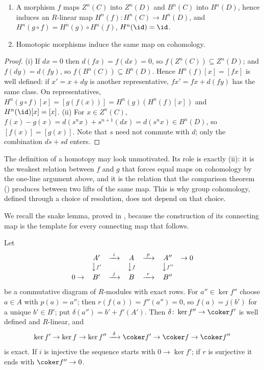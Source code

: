 \begin{lemma}\label{lem:cohomology:complex-basics}
\begin{enumerate}[label=(\roman*)]
\item A morphism $f$ maps $Z^n(C)$ into $Z^n(D)$ and $B^n(C)$ into $B^n(D)$, hence induces an $R$-linear map $H^n(f)\colon H^n(C)\to H^n(D)$, and
$H^n(g\circ f)=H^n(g)\circ H^n(f)$, $H^n(\id)=\id$.
\item Homotopic morphisms induce the same map on cohomology.
\end{enumerate}
\end{lemma}

\begin{proof}
(i) If $dx=0$ then $d(fx)=f(dx)=0$, so $f(Z^n(C))\subseteq Z^n(D)$; and $f(dy)=d(fy)$, so $f(B^n(C))\subseteq B^n(D)$. Hence $H^n(f)[x]=[fx]$ is well
defined: if $x'=x+dy$ is another representative, $fx'=fx+d(fy)$ has the same class. On representatives, $H^n(g\circ f)[x]=[g(f(x))]=H^n(g)(H^n(f)[x])$ and
$H^n(\id)[x]=[x]$. (ii) For $x\in Z^n(C)$,
$f(x)-g(x)=d(s^nx)+s^{n+1}(dx)=d(s^nx)\in B^n(D)$, so $[f(x)]=[g(x)]$. Note that $s$ need not commute with $d$; only the combination $ds+sd$ enters.
\end{proof}

The definition of a homotopy may look unmotivated. Its role is exactly (ii): it is the weakest relation between $f$ and $g$ that forces equal maps on
cohomology by the one-line argument above, and it is the relation that the comparison theorem () produces between two
lifts of the same map. This is why group cohomology, defined through a choice of resolution, does not depend on that choice.

We recall the snake lemma, proved in , because the construction of its connecting map is the template for every connecting map that
follows.

\begin{lemma}\label{lem:cohomology:snake}
Let
\[
\begin{array}{ccccccc}
 & A' & \xrightarrow{\ i\ } & A & \xrightarrow{\ p\ } & A'' & \to 0\\
 & \big\downarrow{\scriptstyle f'} & & \big\downarrow{\scriptstyle f} & & \big\downarrow{\scriptstyle f''} & \\
0\to & B' & \xrightarrow{\ j\ } & B & \xrightarrow{\ r\ } & B'' &
\end{array}
\]
be a commutative diagram of $R$-modules with exact rows. For $a''\in\ker f''$ choose $a\in A$ with $p(a)=a''$; then $r(f(a))=f''(a'')=0$, so $f(a)=j(b')$
for a unique $b'\in B'$; put $\delta(a'')=b'+f'(A')$. Then $\delta\colon\ker f''\to\coker f'$ is well defined and $R$-linear, and
\[
\ker f'\to\ker f\to\ker f''\xrightarrow{\ \delta\ }\coker f'\to\coker f\to\coker f''
\]
is exact. If $i$ is injective the sequence starts with $0\to\ker f'$; if $r$ is surjective it ends with $\coker f''\to0$.
\end{lemma}

